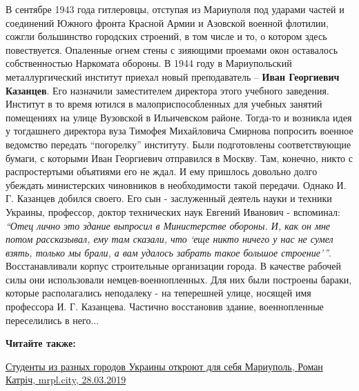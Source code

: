В сентябре 1943 года гитлеровцы, отступая из Мариуполя под ударами частей и
соединений Южного фронта Красной Армии и Азовской военной флотилии, сожгли
большинство городских строений, в том числе и то, о котором здесь повествуется.
Опаленные огнем стены с зияющими проемами окон оставалось собственностью
Наркомата обороны. В 1944 году в Мариупольский металлургический институт
приехал новый преподаватель – \textbf{Иван Георгиевич Казанцев}. Его назначили
заместителем директора этого учебного заведения. Институт в то время ютился в
малоприспособленных для учебных занятий помещениях на улице Вузовской в
Ильичевском районе. Тогда-то и возникла идея у тогдашнего директора вуза
Тимофея Михайловича Смирнова попросить военное ведомство передать \enquote{погорелку}
институту. Были подготовлены соответствующие бумаги, с которыми Иван Георгиевич
отправился в Москву. Там, конечно, никто с распростертыми объятиями его не
ждал. И ему пришлось довольно долго убеждать министерских чиновников в
необходимости такой передачи. Однако И. Г. Казанцев добился своего. Его сын -
заслуженный деятель науки и техники Украины, профессор, доктор технических наук
Евгений Иванович - вспоминал: \emph{\enquote{Отец лично это здание выпросил в Министерстве
обороны. И, как он мне потом рассказывал, ему там сказали, что \enquote{еще никто
ничего у нас не сумел взять, только мы брали, а вам удалось забрать такое
большое строение}}}. Восстанавливали корпус строительные организации города. В
качестве рабочей силы они использовали немцев-военнопленных. Для них были
построены бараки, которые располагались неподалеку - на теперешней улице,
носящей имя профессора И. Г. Казанцева. Частично восстановив здание,
военнопленные переселились в него...

\textbf{Читайте также:} 

\href{https://mrpl.city/news/view/studenty-iz-raznyh-gorodov-ukrainy-otkroyut-dlya-sebya-mariupol}{%
Студенты из разных городов Украины откроют для себя Мариуполь, Роман Катріч, mrpl.city, 28.03.2019}

